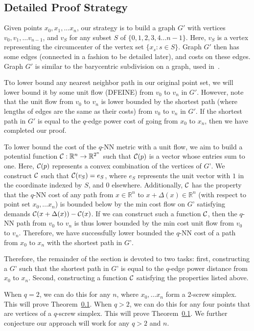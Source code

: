 \subsection{Detailed Proof Strategy}

Given points $x_0, x_1, \ldots x_n$, our strategy is to build a graph $G'$ with
vertices $v_0, v_1, \ldots v_{n-1}$, and $v_S$ for any subset $S$ of
$\{0,1,2,3,4 \ldots n-1 \}$. Here, $v_S$ is a vertex representing the
circumcenter of the vertex set $\{x_s: s \in S\}$. Graph $G'$ then has some
edges (connected in a fashion to be detailed later), and costs on these edges.
Graph $G'$ is similar to the barycentric subdivision on a graph, used
in~\cite{}.

Tto lower bound any nearest neighbor path in our original point set, we will
lower bound it by some unit flow (DFEINE) from $v_0$ to $v_n$ in $G'$. However,
note that the unit flow from $v_0$ to $v_n$ is lower bounded by the shortest
path (where lengths of edges are the same as their costs) from $v_0$ to $v_n$
in $G'$. If the shortest path in $G'$ is equal to the $q$-edge power cost of
going from $x_0$ to $x_n$, then we have completed our proof.

To lower bound the cost of the $q$-NN metric with a unit flow, we aim to build
a potential function $\mathcal{C}:\mathbb{R}^n \rightarrow \mathbb{R}^{2^n}$ such
that $\mathcal{C}(p)$ is a vector whose entries sum to one. Here, $\mathcal{C}(p)$
represents a convex combination of the vertices of $G’$. We construct $\mathcal{C}$
such that $\mathcal{C}(v_S) = e_S$, where $e_S$ represents the unit vector with $1$
in the coordinate indexed by $S$, and $0$ elsewhere. Additionally, $\mathcal{C}$ has
the property that the $q$-NN cost of any path from $x \in \mathbb{R}^n$ to
$x+\Delta(x) \in \mathbb{R}^n$ (with respect to point set $x_0, \ldots x_n$) is
bounded below by the min cost flow on $G’$ satisfying demands
$\mathcal{C}(x+\Delta(x)) - \mathcal{C}(x)$. If we can construct such a function $\mathcal{C}$,
then the $q$-NN path from $v_0$ to $v_n$ is thus lower bounded by the min cost
unit flow from $v_0$ to $v_n$. Therefore, we have successfully lower bounded
the $q$-NN cost of a path from $x_0$ to $x_n$ with the shortest path in $G’$.

Therefore, the remainder of the section is devoted to two tasks: first,
constructing a $G’$ such that the shortest path in $G’$ is equal to the
$q$-edge power distance from $x_0$ to $x_n$. Second, constructing a function
$\mathcal{C}$ satisfying the properties listed above.

When $q = 2$, we can do this for any $n$, where $x_0, \ldots x_n$ form a
$2$-screw simplex. This will prove Theorem~\ref{}. When $q > 2$, we can do this
for any four points that are vertices of a $q$-screw simplex. This will prove
Theorem~\ref{}. We further conjecture our approach will work for any $q > 2$
and $n$.

